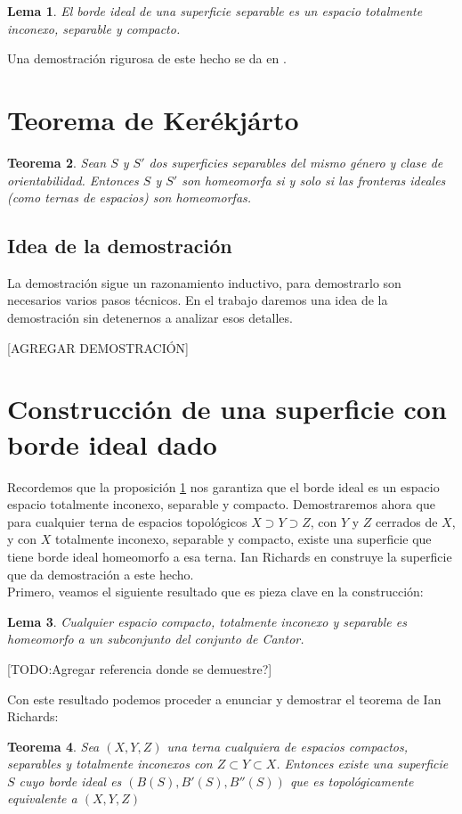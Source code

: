 \documentclass[a4paper,11pt,spanish, twoside, leqno]{tfg-uam}
\newtheorem{teor}{Teorema}[chapter]
\newtheorem{lema}[teor]{Lema}
\theoremstyle{definition}
\begin{document}
\begin{lema}
\label{lema:fronteraidealnoconexo}
El borde ideal de una superficie separable es un espacio totalmente inconexo, separable y compacto.
\end{lema}
Una demostración rigurosa de este hecho se da en \cite{Ahlfors}.

\section{Teorema de Kerékjárto}
\begin{teor}
Sean $S$ y $S'$ dos superficies separables del mismo género y clase de orientabilidad. Entonces $S$ y $S'$ son homeomorfa si y solo si las fronteras ideales (como ternas de espacios) son homeomorfas.
\end{teor}

\subsection{Idea de la demostración}
La demostración sigue un razonamiento inductivo, para demostrarlo son necesarios varios pasos técnicos. En el trabajo daremos una idea de la demostración sin detenernos a analizar esos detalles.

[AGREGAR DEMOSTRACIÓN]

\section{Construcción de una superficie con borde ideal dado}
Recordemos que la proposición \ref{lema:fronteraidealnoconexo} nos garantiza que el borde ideal es un espacio espacio totalmente inconexo, separable y compacto. Demostraremos ahora que para cualquier terna de espacios topológicos $X \supset Y \supset Z$, con $Y$ y $Z$ cerrados de $X$, y con $X$ totalmente inconexo, separable y compacto, existe una superficie que tiene borde ideal homeomorfo a esa terna. Ian Richards en \cite{ian} construye la superficie que da demostración a este hecho.\\
Primero, veamos el siguiente resultado que es pieza clave en la construcción:
\begin{lema}
\label{lema:cantor}
Cualquier espacio compacto, totalmente inconexo y separable es homeomorfo a un subconjunto del conjunto de Cantor.
\end{lema}
[TODO:Agregar referencia donde se demuestre?]

Con este resultado podemos proceder a enunciar y demostrar el teorema de Ian Richards:
\begin{teor}
\label{teor:richards}
Sea $(X,Y,Z)$ una terna cualquiera de espacios compactos, separables y totalmente inconexos con $Z \subset Y \subset X$.  Entonces existe una superficie $S$ cuyo borde ideal es $(B(S), B'(S), B''(S))$ que es topológicamente equivalente a $(X,Y,Z)$
\end{teor}
\end{document}
